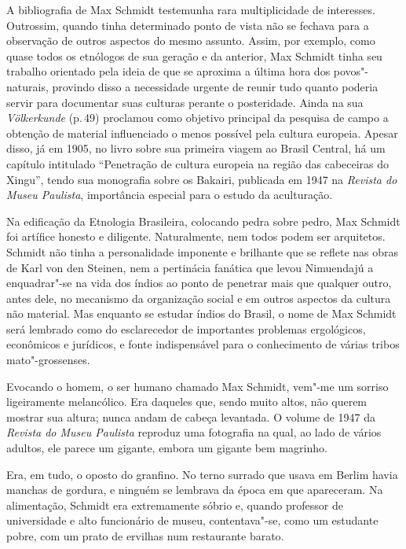{A bibliografia de Max Schmidt testemunha rara multiplicidade de
interesses. Outrossim, quando tinha determinado ponto de vista não se
fechava para a observação de outros aspectos do mesmo assunto. Assim,
por exemplo, como quase todos os etnólogos de sua geração e da anterior,
Max Schmidt tinha seu trabalho orientado pela ideia de que se aproxima a
última hora dos povos"-naturais, provindo disso a necessidade urgente de
reunir tudo quanto poderia servir para documentar suas culturas perante
o posteridade. Ainda na sua \textit{Völkerkunde} (p.\,49) proclamou como
objetivo principal da pesquisa de campo a obtenção de material
influenciado o menos possível pela cultura europeia. Apesar disso, já em
1905, no livro sobre sua primeira viagem ao Brasil Central, há um
capítulo intitulado ``Penetração de cultura europeia na região das
cabeceiras do Xingu'', tendo sua monografia sobre os Bakairi, publicada
em 1947 na \textit{Revista do Museu Paulista}, importância especial para o
estudo da aculturação.

Na edificação da Etnologia Brasileira, colocando pedra sobre pedro, Max
Schmidt foi artífice honesto e diligente. Naturalmente, nem todos podem
ser arquitetos. Schmidt não tinha a personalidade imponente e brilhante
que se reflete nas obras de Karl von den Steinen, nem a pertinácia
fanática que levou Nimuendajú a enquadrar"-se na vida dos índios ao ponto
de penetrar mais que qualquer outro, antes dele, no mecanismo da
organização social e em outros aspectos da cultura não material. Mas
enquanto se estudar índios do Brasil, o nome de Max Schmidt será
lembrado como do esclarecedor de importantes problemas ergológicos,
econômicos e jurídicos, e fonte indispensável para o conhecimento de
várias tribos mato"-grossenses.


Evocando o homem, o ser humano chamado Max Schmidt, vem"-me um sorriso
ligeiramente melancólico. Era daqueles que, sendo muito altos, não
querem mostrar sua altura; nunca andam de cabeça levantada. O volume de
1947 da \textit{Revista do Museu Paulista} reproduz uma fotografia na
qual, ao lado de vários adultos, ele parece um gigante, embora um
gigante bem magrinho.

Era, em tudo, o oposto do granfino. No terno surrado que usava em Berlim
havia manchas de gordura, e ninguém se lembrava da época em que
apareceram. Na alimentação, Schmidt era extremamente sóbrio e, quando
professor de universidade e alto funcionário de museu, contentava"-se,
como um estudante pobre, com um prato de ervilhas num restaurante
barato.

}

